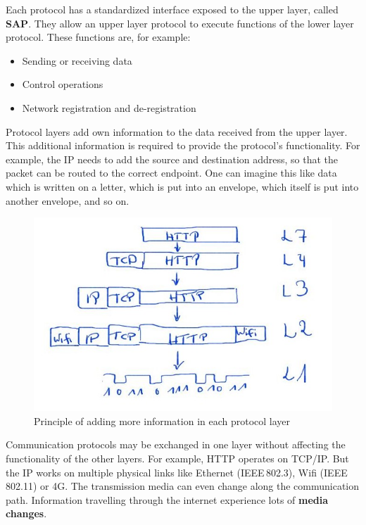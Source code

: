 \begin{refsection}
Each protocol has a standardized interface exposed to the upper layer, called  \textbf{\ac{SAP}}. They allow an upper layer protocol to execute functions of the lower layer protocol. These functions are, for example:
\begin{itemize}
	\item Sending or receiving data
	\item Control operations
	\item Network registration and de-registration
\end{itemize}

Protocol layers add own information to the data received from the upper layer. This additional information is required to provide the protocol's functionality. For example, the \acf{IP} needs to add the source and destination address, so that the packet can be routed to the correct endpoint. One can imagine this like data which is written on a letter, which is put into an envelope, which itself is put into another envelope, and so on.

\begin{figure}[H]
	\centering
	\includegraphics{../chapter01/Frame_Wrapping.jpg}
	\caption{Principle of adding more information in each protocol layer}
	\label{fig:ch01:frame_construction}
\end{figure}

Communication protocols may be exchanged in one layer without affecting the functionality of the other layers. For example, \ac{HTTP} operates on \acs{TCP}/\acs{IP}. But the \acf{IP} works on multiple physical links like Ethernet (IEEE\,802.3), Wifi (IEEE\,802.11) or 4G. The transmission media can even change along the communication path. Information travelling through the internet experience lots of  \textbf{media changes}.



\end{refsection}
